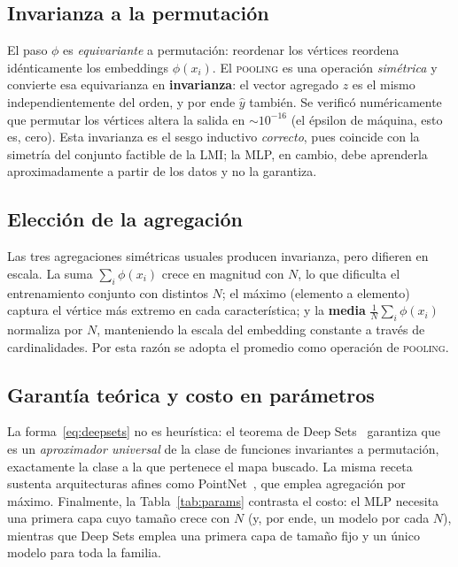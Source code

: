 \subsection{Invarianza a la permutación}
\label{subsec:invarianza}

El paso $\phi$ es \emph{equivariante} a permutación: reordenar los vértices reordena
idénticamente los embeddings $\phi(x_i)$. El \textsc{pooling} es una operación \emph{simétrica}
y convierte esa equivarianza en \textbf{invarianza}: el vector agregado $z$ es el mismo
independientemente del orden, y por ende $\hat y$ también. Se verificó numéricamente que
permutar los vértices altera la salida en $\sim 10^{-16}$ (el épsilon de máquina, esto es,
cero). Esta invarianza es el sesgo inductivo \emph{correcto}, pues coincide con la simetría
del conjunto factible de la LMI; la MLP, en cambio, debe aprenderla aproximadamente a partir
de los datos y no la garantiza.

\subsection{Elección de la agregación}
\label{subsec:pooling}

Las tres agregaciones simétricas usuales producen invarianza, pero difieren en escala. La
suma $\sum_i \phi(x_i)$ crece en magnitud con $N$, lo que dificulta el entrenamiento conjunto
con distintos $N$; el máximo (elemento a elemento) captura el vértice más extremo en cada
característica; y la \textbf{media} $\frac1N\sum_i \phi(x_i)$ normaliza por $N$, manteniendo la
escala del embedding constante a través de cardinalidades. Por esta razón se adopta el promedio
como operación de \textsc{pooling}.

\subsection{Garantía teórica y costo en parámetros}
\label{subsec:teoria_params}

La forma~\eqref{eq:deepsets} no es heurística: el teorema de Deep
Sets~\cite{zaheer2017deep} garantiza que es un \emph{aproximador universal} de la clase de
funciones invariantes a permutación, exactamente la clase a la que pertenece el mapa buscado.
La misma receta sustenta arquitecturas afines como PointNet~\cite{qi2017pointnet}, que emplea
agregación por máximo. Finalmente, la Tabla~\ref{tab:params} contrasta el costo: el MLP
necesita una primera capa cuyo tamaño crece con $N$ (y, por ende, un modelo por cada $N$),
mientras que Deep Sets emplea una primera capa de tamaño fijo y un único modelo para toda la
familia.

